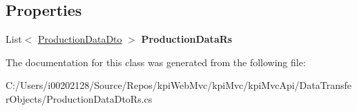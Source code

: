 \subsection*{Properties}
\begin{DoxyCompactItemize}
\item 
\mbox{\label{classkpi_mvc_api_1_1_data_transfer_objects_1_1_production_data_dto_rs_ab3c5239209ee5b18d5df489c9ca49b24}} 
List$<$ \hyperlink{classkpi_mvc_api_1_1_data_transfer_objects_1_1_production_data_dto}{Production\+Data\+Dto} $>$ {\bfseries Production\+Data\+Rs}
\end{DoxyCompactItemize}


The documentation for this class was generated from the following file\+:\begin{DoxyCompactItemize}
\item 
C\+:/\+Users/i00202128/\+Source/\+Repos/kpi\+Web\+Mvc/kpi\+Mvc/kpi\+Mvc\+Api/\+Data\+Transfer\+Objects/Production\+Data\+Dto\+Rs.\+cs\end{DoxyCompactItemize}
